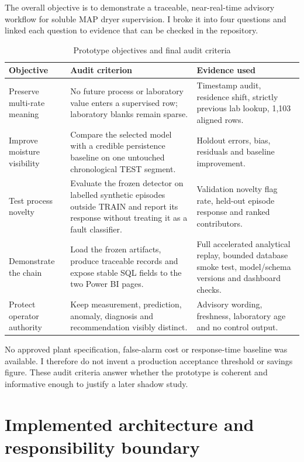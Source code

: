 The overall objective is to demonstrate a traceable, near-real-time advisory workflow for soluble MAP dryer supervision. I broke it into four questions and linked each question to evidence that can be checked in the repository.

\begin{table}[htbp]
\centering\small
\caption{Prototype objectives and final audit criteria}
\label{tab:success-criteria}
\begin{tabularx}{\textwidth}{@{}p{}p{}Y@{}}
\toprule
Objective & Audit criterion & Evidence used \\
\midrule
Preserve multi-rate meaning & No future process or laboratory value enters a supervised row; laboratory blanks remain sparse. & Timestamp audit, residence shift, strictly previous lab lookup, 1,103 aligned rows. \\
Improve moisture visibility & Compare the selected model with a credible persistence baseline on one untouched chronological TEST segment. & Holdout errors, bias, residuals and baseline improvement. \\
Test process novelty & Evaluate the frozen detector on labelled synthetic episodes outside TRAIN and report its response without treating it as a fault classifier. & Validation novelty flag rate, held-out episode response and ranked contributors. \\
Demonstrate the chain & Load the frozen artifacts, produce traceable records and expose stable SQL fields to the two Power BI pages. & Full accelerated analytical replay, bounded database smoke test, model/schema versions and dashboard checks. \\
Protect operator authority & Keep measurement, prediction, anomaly, diagnosis and recommendation visibly distinct. & Advisory wording, freshness, laboratory age and no control output. \\
\bottomrule
\end{tabularx}
\end{table}

No approved plant specification, false-alarm cost or response-time baseline was available. I therefore do not invent a production acceptance threshold or savings figure. These audit criteria answer whether the prototype is coherent and informative enough to justify a later shadow study.

\section{Implemented architecture and responsibility boundary}

